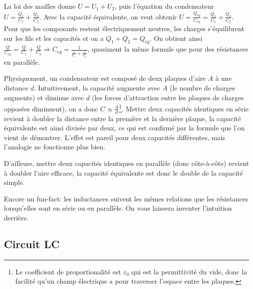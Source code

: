 \documentclass{article}
\begin{document}
La loi des mailles donne $U=U_1+U_2$, puis l'équation du condensateur $U=\frac{Q_1}{C_1}+\frac{Q_2}{C_2}$. Avec la capacité équivalente, on veut obtenir $U=\frac{Q_{eq}}{C_{eq}}=\frac{Q_1}{C_1}+\frac{Q_2}{C_2}$. Pour que les composants restent électriquement neutres, les charges s'équilibrent sur les fils et les capacités et on a $Q_1+Q_2=Q_{eq}$. On obtient ainsi $\frac{Q}{C_{eq}}=\frac{Q}{C_1}+\frac{Q}{C_2}\Rightarrow C_{eq}=\frac{1}{\frac{1}{C_1}+\frac{1}{C_2}}$, quasiment la même formule que pour des résistances en parallèle.

Physiquement, un condensateur est composé de deux plaques d'aire $A$ à une distance $d$. Intuitivement, la capacité augmente avec $A$ (le nombre de charges augmente) et diminue avec $d$ (les forces d'attraction entre les plaques de charges opposées diminuent), on a donc $C\propto\frac{A}{d}$\footnote{Le coefficient de proportionalité est $\varepsilon_0$ qui est la permittivité du vide, donc la facilité qu'un champ électrique a pour traverser l'espace entre les plaques.}. Mettre deux capacités identiques en série revient à doubler la distance entre la première et la dernière plaque, la capacité équivalente est ainsi divisée par deux, ce qui est confirmé par la formule que l'on vient de démontrer. L'effet est pareil pour deux capacités différentes, mais l'analogie ne fonctionne plus bien.

D'ailleurs, mettre deux capacités identiques en parallèle (donc côte-à-côte) revient à doubler l'aire efficace, la capacité équivalente est donc le double de la capacité simple.

Encore un fun-fact: les inductances suivent les mêmes relations que les résistances lorsqu'elles sont en série ou en parallèle. On vous laissera inventer l'intuition derrière.

\subsection{Circuit LC}
\end{document}
